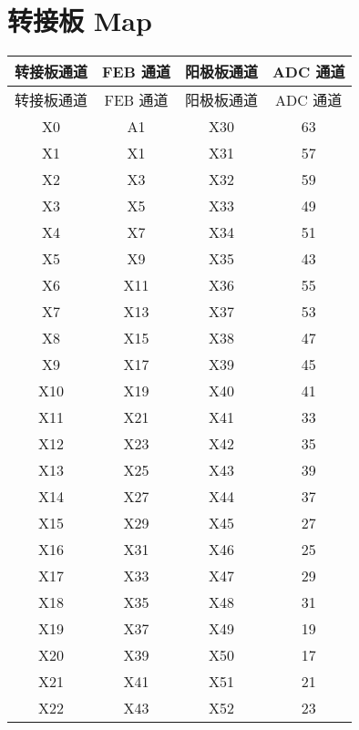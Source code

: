 \section{转接板 Map}
\begin{longtable}{|c|c|c|c|}
  \hline
  转接板通道 & FEB 通道 & 阳极板通道 & ADC 通道 \\ \hline
  \endfirsthead
  
  \hline
  转接板通道 & FEB 通道 & 阳极板通道 & ADC 通道 \\ \hline
  \endhead
  
  \hline
  \endfoot
  
  \hline
  \endlastfoot
  
  X0    & A1     & X30   & 63     \\ \hline
  X1    & X1     & X31   & 57     \\ \hline
  X2    & X3     & X32   & 59     \\ \hline
  X3    & X5     & X33   & 49     \\ \hline
  X4    & X7     & X34   & 51     \\ \hline
  X5    & X9     & X35   & 43     \\ \hline
  X6    & X11    & X36   & 55     \\ \hline
  X7    & X13    & X37   & 53     \\ \hline
  X8    & X15    & X38   & 47     \\ \hline
  X9    & X17    & X39   & 45     \\ \hline
  X10   & X19    & X40   & 41     \\ \hline
  X11   & X21    & X41   & 33     \\ \hline
  X12   & X23    & X42   & 35     \\ \hline
  X13   & X25    & X43   & 39     \\ \hline
  X14   & X27    & X44   & 37     \\ \hline
  X15   & X29    & X45   & 27     \\ \hline
  X16   & X31    & X46   & 25     \\ \hline
  X17   & X33    & X47   & 29     \\ \hline
  X18   & X35    & X48   & 31     \\ \hline
  X19   & X37    & X49   & 19     \\ \hline
  X20   & X39    & X50   & 17     \\ \hline
  X21   & X41    & X51   & 21     \\ \hline
  X22   & X43    & X52   & 23     \\ \hline

\end{longtable}
